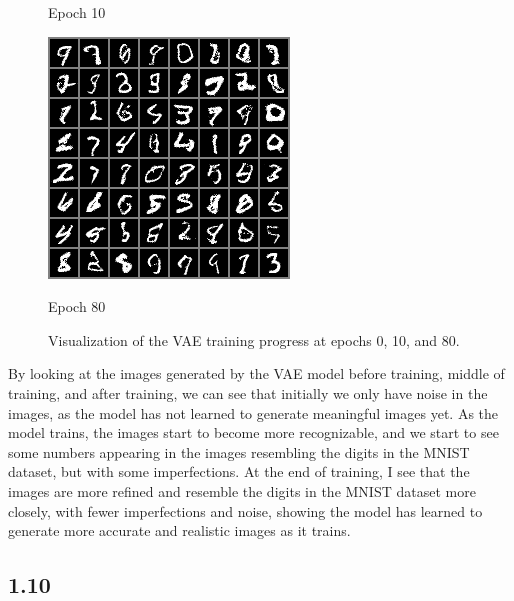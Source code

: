\documentclass{article}
\begin{document}
\begin{figure}[H]
\begin{minipage}{0.3\textwidth}
        \caption{Epoch 10}
        \label{fig:epoch_10}
    \end{minipage}
    \hfill
    \begin{minipage}{0.3\textwidth}
        \centering
        \includegraphics[width=\textwidth]{images/epoch_80_samples.png}
        \caption{Epoch 80}
        \label{fig:epoch_80}
    \end{minipage}
    \caption{Visualization of the VAE training progress at epochs 0, 10, and 80.}
    \label{fig:vae_epochs}
\end{figure}

By looking at the images generated by the VAE model before training, middle of training, and after training, we can see that initially we only have noise in the images, as the model has not learned to generate meaningful images yet. As the model trains, the images start to become more recognizable, and we start to see some numbers appearing in the images resembling the digits in the MNIST dataset, but with some imperfections. At the end of training, I see that the images are more refined and resemble the digits in the MNIST dataset more closely, with fewer imperfections and noise, showing the model has learned to generate more accurate and realistic images as it trains.

\subsection*{1.10}
\end{document}
